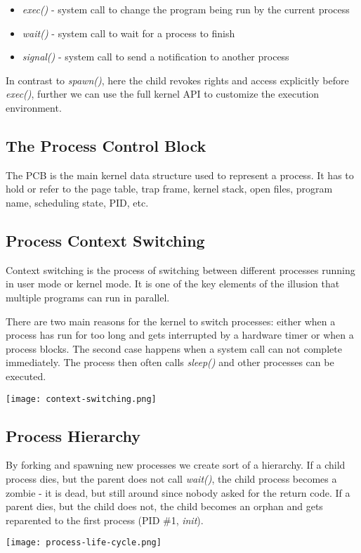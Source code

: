 \begin{itemize}
	\item \textit{exec()} - system call to change the program being run by the current process
	\item \textit{wait()} - system call to wait for a process to finish
	\item \textit{signal()} - system call to send a notification to another process
\end{itemize}

In contrast to \textit{spawn()}, here the child revokes rights and access explicitly before \textit{exec()}, further we can use the full kernel API to customize the execution environment.


\subsection{The Process Control Block}

The PCB is the main kernel data structure used to represent a process. It has to hold or refer to the page table, trap frame, kernel stack, open files, program name, scheduling state, PID, etc.


\subsection{Process Context Switching}

Context switching is the process of switching between different processes running in user mode or kernel mode. It is one of the key elements of the illusion that multiple programs can run in parallel. \columnbreak

There are two main reasons for the kernel to switch processes: either when a process has run for too long and gets interrupted by a hardware timer or when a process blocks. The second case happens when a system call can not complete immediately. The process then often calls \textit{sleep()} and other processes can be executed.
\begin{center}
	\texttt{[image: context-switching.png]}
\end{center}


\subsection{Process Hierarchy}

By forking and spawning new processes we create sort of a hierarchy. If a child process dies, but the parent does not call \textit{wait()}, the child process becomes a zombie - it is dead, but still around since nobody asked for the return code. If a parent dies, but the child does not, the child becomes an orphan and gets reparented to the first process (PID \#1, \textit{init}).
\begin{center}
	\texttt{[image: process-life-cycle.png]}
\end{center}

